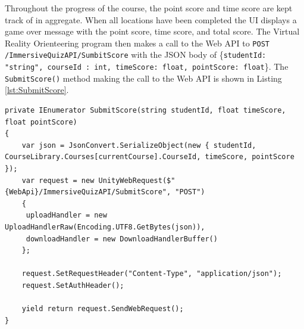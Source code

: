 Throughout the progress of the course, the point score and time score are kept track of in aggregate. When all locations have been completed the UI displays a game over message with the point score, time score, and total score. The Virtual Reality Orienteering program then makes a call to the Web API to \lstinline{POST /ImmersiveQuizAPI/SumbitScore} with the JSON body of \{\lstinline{studentId: "string", courseId : int, timeScore: float, pointScore: float}\}. The \lstinline{SubmitScore()} method making the call to the Web API is shown in Listing \ref{lst:SubmitScore}.
\begin{lstlisting}[caption=Sumbit Score, label=lst:SubmitScore]
private IEnumerator SubmitScore(string studentId, float timeScore, float pointScore)
{
	var json = JsonConvert.SerializeObject(new { studentId, CourseLibrary.Courses[currentCourse].CourseId, timeScore, pointScore });
	var request = new UnityWebRequest($"{WebApi}/ImmersiveQuizAPI/SubmitScore", "POST")
	{
	 uploadHandler = new UploadHandlerRaw(Encoding.UTF8.GetBytes(json)),
	 downloadHandler = new DownloadHandlerBuffer()
	};
	
	request.SetRequestHeader("Content-Type", "application/json");
	request.SetAuthHeader();
	
	yield return request.SendWebRequest();
}
\end{lstlisting}

